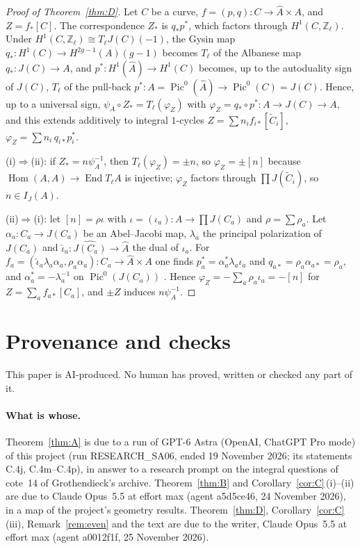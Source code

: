 \documentclass[11pt,a4paper]{article}
\theoremstyle{definition}
\newcommand{\Z}{\mathbb{Z}}
\renewcommand{\IJ}{I_J}
\newcommand{\Pic}{\operatorname{Pic}}
\newcommand{\Hom}{\operatorname{Hom}}
\begin{document}
\begin{proof}[Proof of Theorem~\ref{thm:D}]
Let $C$ be a curve, $f=(p,q)\colon C\to\widehat A\times A$, and $Z=f_*[C]$.
The correspondence $Z_*$ is $q_*p^*$, which factors through $H^1(C,\Z_\ell)$.
Under $H^1(C,\Z_\ell)\cong T_\ell J(C)(-1)$, the Gysin map
$q_*\colon H^1(C)\to H^{2g-1}(A)(g-1)$ becomes $T_\ell$ of the Albanese map
$q_*\colon J(C)\to A$, and $p^*\colon H^1(\widehat A)\to H^1(C)$ becomes,
up to the autoduality sign of $J(C)$, $T_\ell$ of the pull-back
$p^*\colon A=\Pic^0(\widehat A)\to\Pic^0(C)=J(C)$. Hence, up to a universal
sign, $\psi_A\circ Z_*=T_\ell(\varphi_Z)$ with $\varphi_Z=q_*\circ p^*\colon
A\to J(C)\to A$, and this extends additively to integral $1$-cycles
$Z=\sum n_if_{i*}[\widetilde C_i]$, $\varphi_Z=\sum n_i\,q_{i*}p_i^*$.

(i)$\Rightarrow$(ii): if $Z_*=n\psi_A^{-1}$, then $T_\ell(\varphi_Z)=\pm n$,
so $\varphi_Z=\pm[n]$ because $\Hom(A,A)\to\operatorname{End}T_\ell A$ is
injective; $\varphi_Z$ factors through $\prod J(\widetilde C_i)$, so
$n\in\IJ(A)$.

(ii)$\Rightarrow$(i): let $[n]=\rho\iota$ with $\iota=(\iota_a)\colon A\to
\prod J(C_a)$ and $\rho=\sum\rho_a$. Let $\alpha_a\colon C_a\to J(C_a)$ be an
Abel--Jacobi map, $\lambda_a$ the principal polarization of $J(C_a)$ and
$\widehat\iota_a\colon\widehat{J(C_a)}\to\widehat A$ the dual of $\iota_a$.
For $f_a=(\widehat\iota_a\lambda_a\alpha_a,\rho_a\alpha_a)\colon C_a\to
\widehat A\times A$ one finds $p_a^*=\alpha_a^*\lambda_a\iota_a$ and
$q_{a*}=\rho_a\alpha_{a*}=\rho_a$, and $\alpha_a^*=-\lambda_a^{-1}$ on
$\Pic^0(J(C_a))$ \cite[Lemma~6.9]{Mi}. Hence
$\varphi_{Z}=-\sum_a\rho_a\iota_a=-[n]$ for $Z=\sum_af_{a*}[C_a]$, and
$\pm Z$ induces $n\psi_A^{-1}$.
\end{proof}

\section{Provenance and checks}\label{sec:provenance}

This paper is AI-produced. No human has proved, written or checked any part
of it.

\paragraph{What is whose.} Theorem~\ref{thm:A} is due to a run of GPT-6
Astra (OpenAI, ChatGPT Pro mode) of this project (run RESEARCH\_SA06, ended
19 November 2026; its statements C.4j, C.4m--C.4p), in answer to a research
prompt on the integral questions of cote~14 of Grothendieck's archive.
Theorem~\ref{thm:B} and Corollary~\ref{cor:C}\,(i)--(ii) are due to Claude
Opus~5.5 at effort max (agent a5d5ce46, 24 November 2026), in a map of the
project's geometry results. Theorem~\ref{thm:D}, Corollary~\ref{cor:C}\,(iii),
Remark~\ref{rem:even} and the text are due to the writer, Claude Opus~5.5 at
effort max (agent a0012f1f, 25 November 2026).
\end{document}

